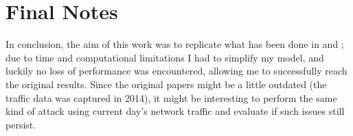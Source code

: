  \section{Final Notes}
 In conclusion, the aim of this work was to replicate what has been done in \cite{contiknocking} and \cite{contianalysis}; due to time and computational limitations I had to simplify my model, and luckily no loss of performance was encountered, allowing me to successfully reach the original results. Since the original papers might be a little outdated (the traffic data was captured in 2014), it might be interesting to perform the same kind of attack using current day's network traffic and evaluate if such issues still persist.
